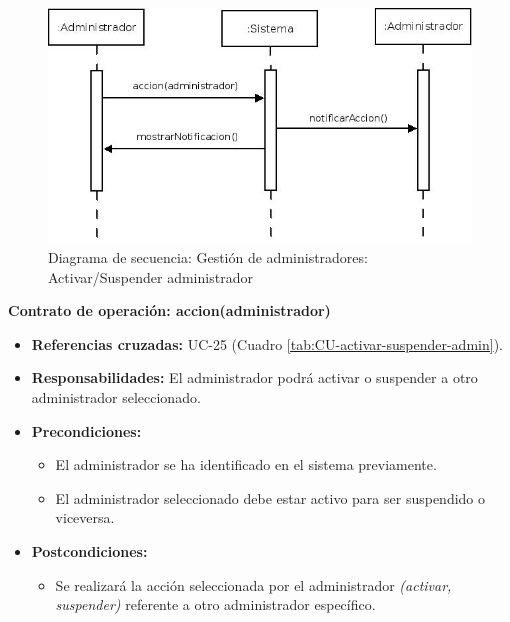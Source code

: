 \begin{figure}[H]
\centering
  \includegraphics[scale=.50]{img/secuencias/gestion-administradores-activar-suspender.jpeg}
  \caption{Diagrama de secuencia: Gestión de administradores: Activar/Suspender administrador}
  \label{fig:secuencia-gestion-administradores-activar-suspender}
\end{figure}

\textbf{Contrato de operación: accion(administrador)}
\begin{itemize}
\item \textbf{Referencias cruzadas:} UC-25 (Cuadro \ref{tab:CU-activar-suspender-admin}).
\item \textbf{Responsabilidades:} El administrador podrá activar o suspender a otro administrador seleccionado.
\item \textbf{Precondiciones:} 
 \begin{itemize}
\item El administrador se ha identificado en el sistema previamente.
\item El administrador seleccionado debe estar activo para ser suspendido o viceversa.
\end {itemize}
\item \textbf{Postcondiciones:} 
 \begin{itemize}
\item Se realizará la acción seleccionada por el administrador \textit{(activar, suspender)} referente a otro administrador específico.
\end {itemize}
\end {itemize}

